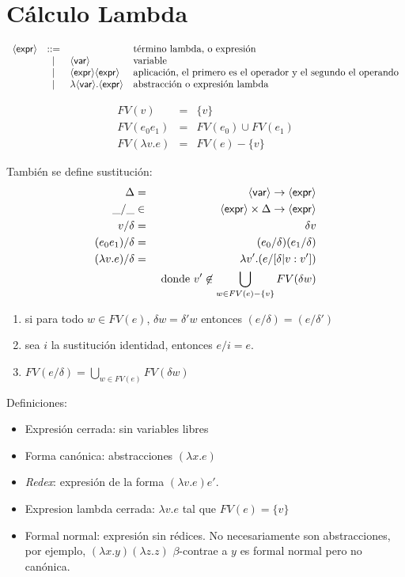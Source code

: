 \section{Cálculo Lambda}
  \[
    \begin{array}{rcll}
      \langle \mathsf{expr} \rangle &::= && \text{término lambda, o expresión} \\
          &|& \langle \mathsf{var} \rangle & \text{variable} \\
          &|& \langle \mathsf{expr} \rangle \langle \mathsf{expr} \rangle & \text{aplicación, el primero es el operador y el segundo el operando} \\
          &|& \lambda \langle \mathsf{var} \rangle.\langle \mathsf{expr} \rangle & \text{abstracción o expresión lambda} \\
    \end{array}
  \]

  \begin{eqnarray*}
    FV(v) &=& \{v\} \\
    FV(e_0 e_1) &=& FV(e_0)\cup FV(e_1) \\
    FV(\lambda v.e) &=& FV(e) - \{v\}
  \end{eqnarray*}
        
  \PN También se define sustitución:
  \begin{eqnarray*}
    \Delta &=& \langle \mathsf{var} \rangle \to \langle \mathsf{expr} \rangle \\
    \_/\_ &\in& \langle \mathsf{expr} \rangle \times \Delta \to \langle \mathsf{expr} \rangle \\
    v/\delta &=& \delta v \\
    (e_0 e_1)/\delta &=& (e_0/\delta) (e_1/\delta) \\
    (\lambda v.e)/\delta &=& \lambda v'.(e/[\delta|v:v']) \\
    && \text{ donde } v' \not\in \bigcup_{w \in FV(e) - \{v\}} FV(\delta w)
  \end{eqnarray*}
        
  \begin{property} \hfill
    \begin{enumerate}
    \item si para todo $w \in FV(e)$, $\delta w = \delta' w$ entonces
      $(e/\delta) = (e/\delta')$
    \item sea $i$ la sustitución identidad, entonces $e/i = e$.
    \item $FV(e/\delta) = \bigcup_{w\in FV(e)} FV(\delta w)$
    \end{enumerate}
  \end{property}

  \PN Definiciones:
  \begin{itemize}
    \item Expresión cerrada: sin variables libres
    \item Forma canónica: abstracciones $(\lambda x.e)$
    \item \textit{Redex}: expresión de la forma $(\lambda v.e) e'$.
    \item Expresion lambda cerrada: $\lambda v.e$ tal que $FV(e) = \{v\}$
    \item Formal normal: expresión sin rédices. No necesariamente son abstracciones, por ejemplo, $(\lambda x.y) (\lambda z.z)$ $\beta$-contrae a $y$ es formal normal pero no canónica.
  \end{itemize}
        
